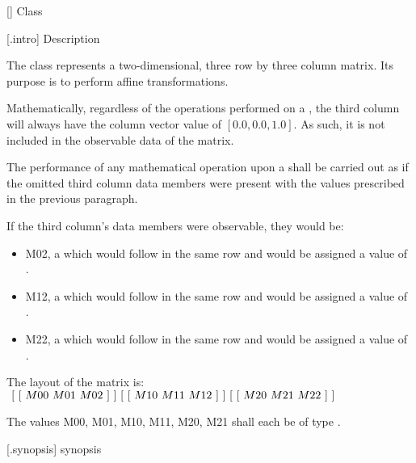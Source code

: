  [\matrixtwod] {Class }

 [\matrixtwod.intro] { Description}

\pnum
{}
The  class represents a two-dimensional, three row by three column matrix. Its purpose is to perform affine transformations.

\pnum
Mathematically, regardless of the operations performed on a , the third column will always have the column vector value of $[0.0, 0.0, 1.0]$. As such, it is not included in the observable data of the matrix.

\pnum
The performance of any mathematical operation upon a  shall be carried out as if the omitted third column data members were present with the values prescribed in the previous paragraph.

\pnum
If the third column's data members were observable, they would be:

\begin{itemize}
\item M02, a  which would follow  in the same row and would be assigned a value of .

\item M12, a  which would follow  in the same row and would be assigned a value of .

\item M22, a  which would follow  in the same row and would be assigned a value of .
\end{itemize}

\pnum
The layout of the matrix is: \\
$
~[~[~M00~M01~M02~]~] \\
~[~[~M10~M11~M12~]~] \\
~[~[~M20~M21~M22~]~]$

\pnum
The values M00, M01, M10, M11, M20, M21 shall each be of type .

 [\matrixtwod.synopsis] { synopsis}


